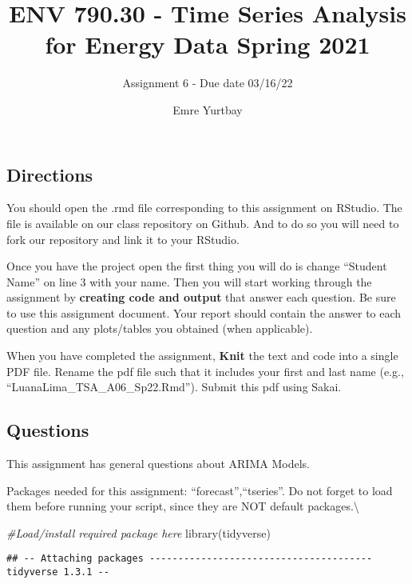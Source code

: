 \documentclass[
]{article}
\title{ENV 790.30 - Time Series Analysis for Energy Data \textbar{}
Spring 2021}
\subtitle{Assignment 6 - Due date 03/16/22}
\author{Emre Yurtbay}
\date{}
\newenvironment{Shaded}{\begin{snugshade}}{\end{snugshade}}
\newcommand{\CommentTok}[1]{\textcolor[rgb]{0.56,0.35,0.01}{\textit{#1}}}
\newcommand{\FunctionTok}[1]{\textcolor[rgb]{0.00,0.00,0.00}{#1}}
\newcommand{\NormalTok}[1]{#1}
\begin{document}
\maketitle

\hypertarget{directions}{%
\subsection{Directions}\label{directions}}

You should open the .rmd file corresponding to this assignment on
RStudio. The file is available on our class repository on Github. And to
do so you will need to fork our repository and link it to your RStudio.

Once you have the project open the first thing you will do is change
``Student Name'' on line 3 with your name. Then you will start working
through the assignment by \textbf{creating code and output} that answer
each question. Be sure to use this assignment document. Your report
should contain the answer to each question and any plots/tables you
obtained (when applicable).

When you have completed the assignment, \textbf{Knit} the text and code
into a single PDF file. Rename the pdf file such that it includes your
first and last name (e.g., ``LuanaLima\_TSA\_A06\_Sp22.Rmd''). Submit
this pdf using Sakai.

\hypertarget{questions}{%
\subsection{Questions}\label{questions}}

This assignment has general questions about ARIMA Models.

Packages needed for this assignment: ``forecast'',``tseries''. Do not
forget to load them before running your script, since they are NOT
default packages.\textbackslash{}

\begin{Shaded}
\begin{Highlighting}[]
\CommentTok{\#Load/install required package here}
\FunctionTok{library}\NormalTok{(tidyverse)}
\end{Highlighting}
\end{Shaded}

\begin{verbatim}
## -- Attaching packages --------------------------------------- tidyverse 1.3.1 --
\end{verbatim}
\end{document}
